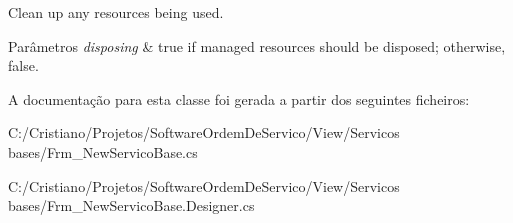 Clean up any resources being used. 


\begin{DoxyParams}{Parâmetros}
{\em disposing} & true if managed resources should be disposed; otherwise, false.\\
\hline
\end{DoxyParams}


A documentação para esta classe foi gerada a partir dos seguintes ficheiros\+:\begin{DoxyCompactItemize}
\item 
C\+:/\+Cristiano/\+Projetos/\+Software\+Ordem\+De\+Servico/\+View/\+Servicos bases/Frm\+\_\+\+New\+Servico\+Base.\+cs\item 
C\+:/\+Cristiano/\+Projetos/\+Software\+Ordem\+De\+Servico/\+View/\+Servicos bases/Frm\+\_\+\+New\+Servico\+Base.\+Designer.\+cs\end{DoxyCompactItemize}
